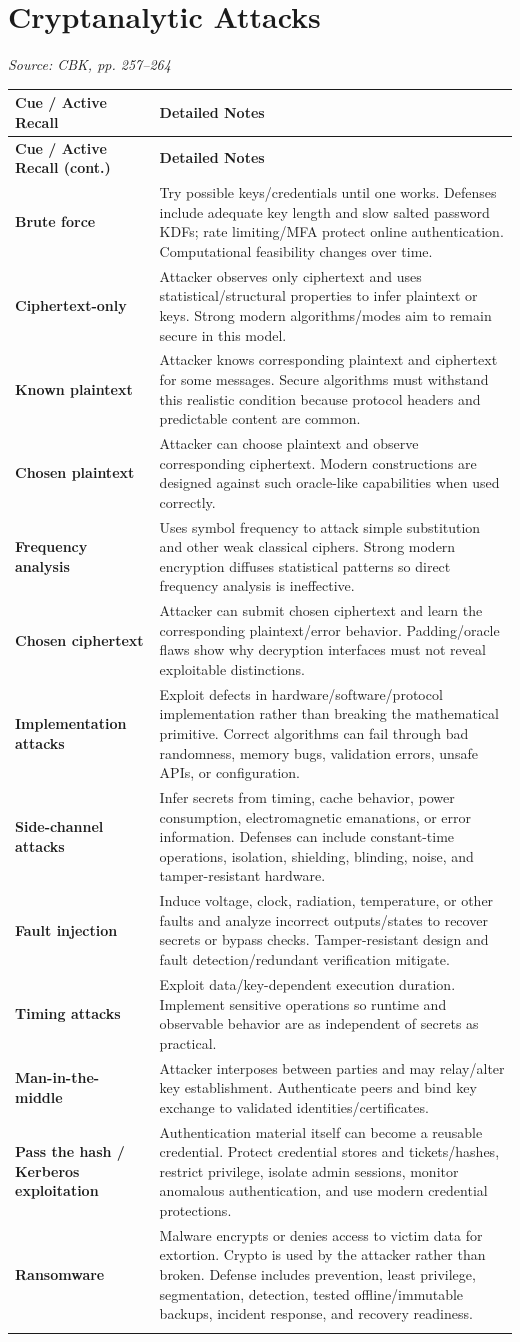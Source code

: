 \documentclass[10pt,letterpaper]{article}
\makeatletter
\newenvironment{cornell}{\rowcolors{2}{white}{notebg}\begin{longtable}{@{}>{\raggedright\arraybackslash\columncolor{cuebg}\color{navy}\bfseries}p{0.285\textwidth}>{\raggedright\arraybackslash}p{0.65\textwidth}@{}}
\rowcolor{navy}\color{white}\textbf{Cue / Active Recall} & \color{white}\textbf{Detailed Notes}\\ \hline\endfirsthead
\rowcolor{navy}\color{white}\textbf{Cue / Active Recall (cont.)} & \color{white}\textbf{Detailed Notes}\\ \hline\endhead}{\end{longtable}}
\newcommand{\noterow}[2]{#1 & #2\\\arrayrulecolor{line}\hline}
\newcommand{\source}[1]{\par{\footnotesize\color{teal}\textit{Source: CBK, #1}}\par}
\makeatother
\begin{document}
\section{\color{navy}Cryptanalytic Attacks}
\source{pp. 257--264}
\begin{cornell}
\noterow{Brute force}{Try possible keys/credentials until one works. Defenses include adequate key length and slow salted password KDFs; rate limiting/MFA protect online authentication. Computational feasibility changes over time.}
\noterow{Ciphertext-only}{Attacker observes only ciphertext and uses statistical/structural properties to infer plaintext or keys. Strong modern algorithms/modes aim to remain secure in this model.}
\noterow{Known plaintext}{Attacker knows corresponding plaintext and ciphertext for some messages. Secure algorithms must withstand this realistic condition because protocol headers and predictable content are common.}
\noterow{Chosen plaintext}{Attacker can choose plaintext and observe corresponding ciphertext. Modern constructions are designed against such oracle-like capabilities when used correctly.}
\noterow{Frequency analysis}{Uses symbol frequency to attack simple substitution and other weak classical ciphers. Strong modern encryption diffuses statistical patterns so direct frequency analysis is ineffective.}
\noterow{Chosen ciphertext}{Attacker can submit chosen ciphertext and learn the corresponding plaintext/error behavior. Padding/oracle flaws show why decryption interfaces must not reveal exploitable distinctions.}
\noterow{Implementation attacks}{Exploit defects in hardware/software/protocol implementation rather than breaking the mathematical primitive. Correct algorithms can fail through bad randomness, memory bugs, validation errors, unsafe APIs, or configuration.}
\noterow{Side-channel attacks}{Infer secrets from timing, cache behavior, power consumption, electromagnetic emanations, or error information. Defenses can include constant-time operations, isolation, shielding, blinding, noise, and tamper-resistant hardware.}
\noterow{Fault injection}{Induce voltage, clock, radiation, temperature, or other faults and analyze incorrect outputs/states to recover secrets or bypass checks. Tamper-resistant design and fault detection/redundant verification mitigate.}
\noterow{Timing attacks}{Exploit data/key-dependent execution duration. Implement sensitive operations so runtime and observable behavior are as independent of secrets as practical.}
\noterow{Man-in-the-middle}{Attacker interposes between parties and may relay/alter key establishment. Authenticate peers and bind key exchange to validated identities/certificates.}
\noterow{Pass the hash / Kerberos exploitation}{Authentication material itself can become a reusable credential. Protect credential stores and tickets/hashes, restrict privilege, isolate admin sessions, monitor anomalous authentication, and use modern credential protections.}
\noterow{Ransomware}{Malware encrypts or denies access to victim data for extortion. Crypto is used by the attacker rather than broken. Defense includes prevention, least privilege, segmentation, detection, tested offline/immutable backups, incident response, and recovery readiness.}
\end{cornell}
\end{document}
